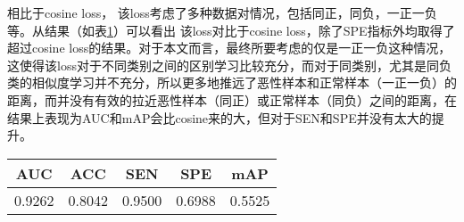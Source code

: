 \begin{comment}
其表达式如下：
\begin{equation}
	L\left(W,\left(Y, X_{1}, X_{2}\right)\right)=\frac{1}{2 N} \sum_{n=1}^{N} Y D_{W}^{2}+(1-Y) \max (m-D w, 0)^{2}
\end{equation}

其中$D \mathrm{w}=\left\|X_{1}-X_{2}\right\|_{2}=\left(\sum_{i}^{N}\left(X_{1}^{i}-X_{2}^{i}\right)^{2}\right)^{\frac{1}{2}}$表示样本特征$X_1$和$X_2$的欧式距离，$Y$为两个样本是否匹配的标签，$Y=1$代表两个代表两个样本相似或者匹配， $Y=0$代表不匹配， $m$为设定的阈值。
\end{comment}
相比于cosine loss， 该loss考虑了多种数据对情况，包括同正，同负，一正一负等。从结果（如表\ref{tab:1_stage_con_pred_result}）可以看出
该loss对比于cosine loss，除了SPE指标外均取得了超过cosine loss的结果。对于本文而言，最终所要考虑的仅是一正一负这种情况，这使得该loss对于不同类别之间的区别学习比较充分，而对于同类别，尤其是同负类的相似度学习并不充分，所以更多地推远了恶性样本和正常样本（一正一负）的距离，而并没有有效的拉近恶性样本（同正）或正常样本（同负）之间的距离，在结果上表现为AUC和mAP会比cosine来的大，但对于SEN和SPE并没有太大的提升。

\begin{table}[!htbp]
    \label{tab:1_stage_con_pred_result}
    \centering
    \footnotesize%
    \setlength{\tabcolsep}{4pt}%
    \renewcommand{\arraystretch}{1.2}%
    \begin{tabular}{ccccc}
        \hline
        AUC& ACC &SEN &SPE &mAP \\
        \hline
        0.9262 &0.8042 &0.9500  &0.6988 &0.5525 \\
        \hline
    \end{tabular}
\end{table}


